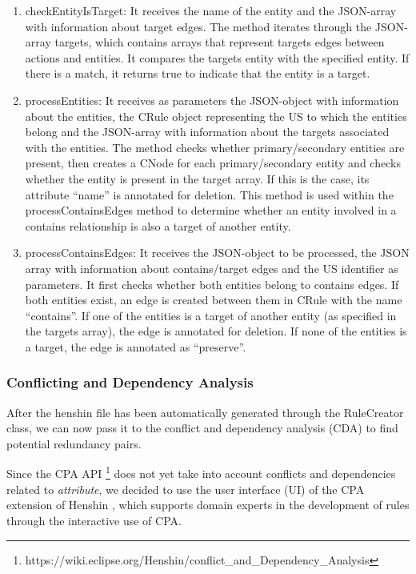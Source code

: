 \begin{enumerate}
	\item checkEntityIsTarget: It receives the name of the entity and the JSON-array with information about target edges. The method iterates through the JSON-array targets, which contains arrays that represent targets edges between actions and entities. It compares the targets entity with the specified entity. If there is a match, it returns true to indicate that the entity is a target.
	\item processEntities: It receives as parameters the JSON-object with information about the entities, the CRule object representing the US to which the entities belong and the JSON-array with information about the targets associated with the entities. The method checks whether primary/secondary entities are present, then creates a CNode for each primary/secondary entity and checks whether the entity is present in the target array. If this is the case, its attribute \enquote{name} is annotated for deletion. This method is used within the processContainsEdges method to determine whether an entity involved in a contains relationship is also a target of another entity.
	\item processContainsEdges: It receives the JSON-object to be processed, the JSON array with information about contains/target edges and the US identifier as parameters. It first checks whether both entities belong to contains edges. If both entities exist, an edge is created between them in CRule with the name \enquote{contains}. If one of the entities is a target of another entity (as specified in the targets array), the edge is annotated for deletion. If none of the entities is a target, the edge is annotated as \enquote{preserve}.
\end{enumerate}
\subsubsection*{Conflicting and Dependency Analysis}
After the henshin file has been automatically generated through the RuleCreator class, we can now pass it to the conflict and dependency analysis (CDA) to find potential redundancy pairs.

Since the CPA API \footnote{https://wiki.eclipse.org/Henshin/conflict\_and\_Dependency\_Analysis} does not yet take into account conflicts and dependencies related to \textit{attribute}, we decided to use the user interface (UI) of the CPA extension of Henshin , which supports domain experts in the development of rules through the interactive use of CPA.

